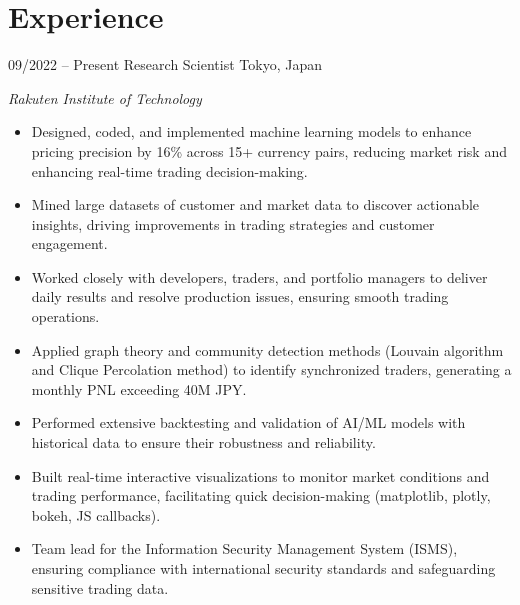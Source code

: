 \section{Experience}
\begin{entrylist}
\entry
{09/2022 -- Present}
{Research Scientist}
{Tokyo, Japan}
{\emph{Rakuten Institute of Technology}
\begin{itemize}
    \item Designed, coded, and implemented machine learning models to enhance pricing precision by 16\% across 15+ currency pairs, reducing market risk and enhancing real-time trading decision-making. %
    \item Mined large datasets of customer and market data to discover actionable insights, driving improvements in trading strategies and customer engagement. %
    \item Worked closely with developers, traders, and portfolio managers to deliver daily results and resolve production issues, ensuring smooth trading operations. %
    \item Applied graph theory and community detection methods (Louvain algorithm and Clique Percolation method) to identify synchronized traders, generating a monthly PNL exceeding 40M JPY. %
    \item Performed extensive backtesting and validation of AI/ML models with historical data to ensure their robustness and reliability. %
	\item Built real-time interactive visualizations to monitor market conditions and trading performance, facilitating quick decision-making (matplotlib, plotly, bokeh, JS callbacks). %
 	\item Team lead for the Information Security Management System (ISMS), ensuring compliance with international security standards and safeguarding sensitive trading data. %
\end{itemize}
}
\end{entrylist}

